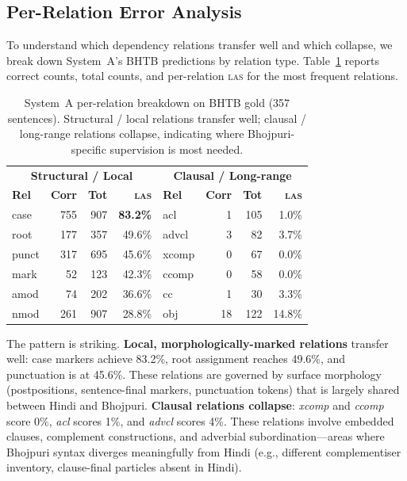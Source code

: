 \documentclass[12pt,a4paper,oneside]{report}
\newcommand{\las}{\textsc{las}}
\begin{document}
\subsection{Per-Relation Error Analysis}
\label{sec:per_relation}

To understand which dependency relations transfer well and which collapse, we
break down System~A's BHTB predictions by relation type. Table~\ref{tab:per_rel}
reports correct counts, total counts, and per-relation \las{} for the most
frequent relations.

\begin{table}[ht]
\centering
\caption{System~A per-relation breakdown on BHTB gold (357 sentences). Structural / local relations transfer well; clausal / long-range relations collapse, indicating where Bhojpuri-specific supervision is most needed.}
\label{tab:per_rel}
\begin{tabular}{@{}lrrr@{\hspace{0.6cm}}lrrr@{}}
\toprule
\multicolumn{4}{c}{\textbf{Structural / Local}} & \multicolumn{4}{c}{\textbf{Clausal / Long-range}} \\
\textbf{Rel} & \textbf{Corr} & \textbf{Tot} & \textbf{\las{}} &
\textbf{Rel} & \textbf{Corr} & \textbf{Tot} & \textbf{\las{}} \\
\midrule
case   & 755 & 907 & \textbf{83.2\%} & acl   &  1 & 105 & 1.0\% \\
root   & 177 & 357 & 49.6\%          & advcl &  3 &  82 & 3.7\% \\
punct  & 317 & 695 & 45.6\%          & xcomp &  0 &  67 & 0.0\% \\
mark   &  52 & 123 & 42.3\%          & ccomp &  0 &  58 & 0.0\% \\
amod   &  74 & 202 & 36.6\%          & cc    &  1 &  30 & 3.3\% \\
nmod   & 261 & 907 & 28.8\%          & obj   & 18 & 122 & 14.8\% \\
\bottomrule
\end{tabular}
\end{table}

The pattern is striking. \textbf{Local, morphologically-marked relations}
transfer well: case markers achieve 83.2\%, root assignment reaches 49.6\%, and
punctuation is at 45.6\%. These relations are governed by surface morphology
(postpositions, sentence-final markers, punctuation tokens) that is largely
shared between Hindi and Bhojpuri. \textbf{Clausal relations collapse}:
\textit{xcomp} and \textit{ccomp} score 0\%, \textit{acl} scores 1\%, and
\textit{advcl} scores 4\%. These relations involve embedded clauses, complement
constructions, and adverbial subordination---areas where Bhojpuri syntax
diverges meaningfully from Hindi (e.g., different complementiser inventory,
clause-final particles absent in Hindi).
\end{document}
